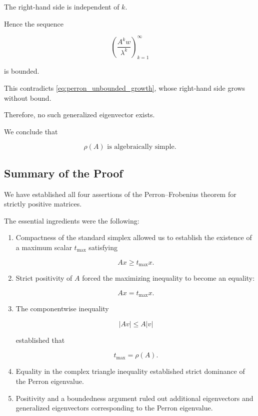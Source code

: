 \documentclass[11pt,a4paper]{article}
\theoremstyle{definition}
\theoremstyle{remark}
\begin{document}
The right-hand side is
independent of $k$.

Hence the sequence

\[
\left(
\frac{A^kw}{\lambda^k}
\right)_{k=1}^{\infty}
\]

is bounded.

This contradicts
\eqref{eq:perron_unbounded_growth},
whose right-hand side
grows without bound.

Therefore, no such generalized
eigenvector exists.

We conclude that

\begin{equation}
\boxed{
\rho(A)\text{ is algebraically simple}.
}
\label{eq:perron_algebraic_simple}
\end{equation}


\subsection{Summary of the Proof}

We have established all four
assertions of the
Perron--Frobenius theorem
for strictly positive matrices.

The essential ingredients
were the following:

\begin{enumerate}

\item
Compactness of the standard simplex
allowed us to establish the
existence of a maximum scalar
$t_{\max}$ satisfying

\[
Ax\geq t_{\max}x.
\]

\item
Strict positivity of $A$
forced the maximizing inequality
to become an equality:

\[
Ax=t_{\max}x.
\]

\item
The componentwise inequality

\[
|Av|\leq A|v|
\]

established that

\[
t_{\max}=\rho(A).
\]

\item
Equality in the complex
triangle inequality established
strict dominance of the
Perron eigenvalue.

\item
Positivity and a boundedness
argument ruled out additional
eigenvectors and generalized
eigenvectors corresponding
to the Perron eigenvalue.

\end{enumerate}
\end{document}
